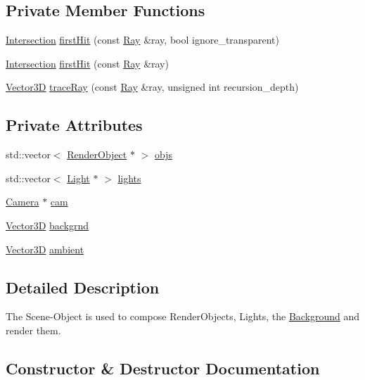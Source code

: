 \subsection*{Private Member Functions}
\begin{DoxyCompactItemize}
\item 
\hyperlink{classIntersection}{Intersection} \hyperlink{classScene_a6f36ad492deab065704c7499341f41d8}{first\+Hit} (const \hyperlink{classRay}{Ray} \&ray, bool ignore\+\_\+transparent)
\item 
\hyperlink{classIntersection}{Intersection} \hyperlink{classScene_aaead0c051b732e5f3e02e86514c0bf2a}{first\+Hit} (const \hyperlink{classRay}{Ray} \&ray)
\item 
\hyperlink{classVector3D}{Vector3D} \hyperlink{classScene_a1d230edebbee2bd667875fbdc76077d5}{trace\+Ray} (const \hyperlink{classRay}{Ray} \&ray, unsigned int recursion\+\_\+depth)
\end{DoxyCompactItemize}
\subsection*{Private Attributes}
\begin{DoxyCompactItemize}
\item 
std\+::vector$<$ \hyperlink{classRenderObject}{Render\+Object} $\ast$ $>$ \hyperlink{classScene_a37361b6054643b62fcb8e6b7c828e5dd}{objs}
\item 
std\+::vector$<$ \hyperlink{classLight}{Light} $\ast$ $>$ \hyperlink{classScene_a4ecc3182a80435e1c4dfbe1b20e559bd}{lights}
\item 
\hyperlink{classCamera}{Camera} $\ast$ \hyperlink{classScene_aeac676eac579e2831faae0eedaa8db8d}{cam}
\item 
\hyperlink{classVector3D}{Vector3D} \hyperlink{classScene_ac745fba97d639cebcf0e8fbf59967da2}{backgrnd}
\item 
\hyperlink{classVector3D}{Vector3D} \hyperlink{classScene_a284ce5b2aeb47c64d6712d9748229c47}{ambient}
\end{DoxyCompactItemize}


\subsection{Detailed Description}
The Scene-\/\+Object is used to compose Render\+Objects, Lights, the \hyperlink{classBackground}{Background} and render them. 

\subsection{Constructor \& Destructor Documentation}
